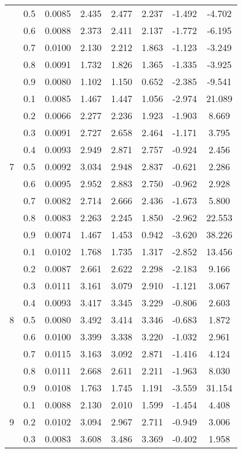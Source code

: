 \documentclass[11pt,a4paper]{report}
\begin{document}
\begin{longtable}{ | c | c || c | c | c | c | c | c | }
 & 0.5 & 0.0085 & 2.435 & 2.477 & 2.237 & -1.492 & -4.702 \\
 & 0.6 & 0.0088 & 2.373 & 2.411 & 2.137 & -1.772 & -6.195 \\
 & 0.7 & 0.0100 & 2.130 & 2.212 & 1.863 & -1.123 & -3.249 \\
 & 0.8 & 0.0091 & 1.732 & 1.826 & 1.365 & -1.335 & -3.925 \\
 & 0.9 & 0.0080 & 1.102 & 1.150 & 0.652 & -2.385 & -9.541 \\
 \hline
\multirow{9}{*}{7} & 0.1 & 0.0085 & 1.467 & 1.447 & 1.056 & -2.974 & 21.089 \\
 & 0.2 & 0.0066 & 2.277 & 2.236 & 1.923 & -1.903 & 8.669 \\
 & 0.3 & 0.0091 & 2.727 & 2.658 & 2.464 & -1.171 & 3.795 \\
 & 0.4 & 0.0093 & 2.949 & 2.871 & 2.757 & -0.924 & 2.456 \\
 & 0.5 & 0.0092 & 3.034 & 2.948 & 2.837 & -0.621 & 2.286 \\
 & 0.6 & 0.0095 & 2.952 & 2.883 & 2.750 & -0.962 & 2.928 \\
 & 0.7 & 0.0082 & 2.714 & 2.666 & 2.436 & -1.673 & 5.800 \\
 & 0.8 & 0.0083 & 2.263 & 2.245 & 1.850 & -2.962 & 22.553 \\
 & 0.9 & 0.0074 & 1.467 & 1.453 & 0.942 & -3.620 & 38.226 \\
 \hline
\multirow{9}{*}{8} & 0.1 & 0.0102 & 1.768 & 1.735 & 1.317 & -2.852 & 13.456 \\
 & 0.2 & 0.0087 & 2.661 & 2.622 & 2.298 & -2.183 & 9.166 \\
 & 0.3 & 0.0111 & 3.161 & 3.079 & 2.910 & -1.121 & 3.067 \\
 & 0.4 & 0.0093 & 3.417 & 3.345 & 3.229 & -0.806 & 2.603 \\
 & 0.5 & 0.0080 & 3.492 & 3.414 & 3.346 & -0.683 & 1.872 \\
 & 0.6 & 0.0100 & 3.399 & 3.338 & 3.220 & -1.032 & 2.961 \\
 & 0.7 & 0.0115 & 3.163 & 3.092 & 2.871 & -1.416 & 4.124 \\
 & 0.8 & 0.0111 & 2.668 & 2.611 & 2.211 & -1.963 & 8.030 \\
 & 0.9 & 0.0108 & 1.763 & 1.745 & 1.191 & -3.559 & 31.154 \\
 \hline
\multirow{9}{*}{9} & 0.1 & 0.0088 & 2.130 & 2.010 & 1.599 & -1.454 & 4.408 \\
 & 0.2 & 0.0102 & 3.094 & 2.967 & 2.711 & -0.949 & 3.006 \\
 & 0.3 & 0.0083 & 3.608 & 3.486 & 3.369 & -0.402 & 1.958 \\

\end{longtable}
\end{document}

